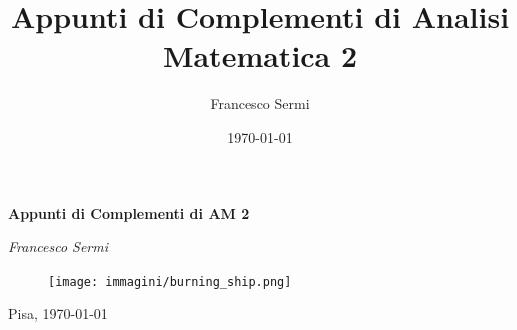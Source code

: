 \documentclass[12pt, twoside, italian, openany]{book}
\title{Appunti di Complementi di Analisi Matematica 2}
\author{Francesco Sermi}
\date{\today}
\begin{document}
	\begin{titlepage}
	\centering
	\vspace*{3cm}
	{\huge\bfseries Appunti di Complementi di AM 2 \par}
	\vspace{2cm}
	{\Large\itshape Francesco Sermi\par}
	\vfill
	\begin{figure}[H]
		\centering
		\texttt{[image: immagini/burning\_ship.png]}
	\end{figure}




	\vfill	
	{\large \hfill Pisa, \today \par}
	\end{titlepage}
\end{document}
